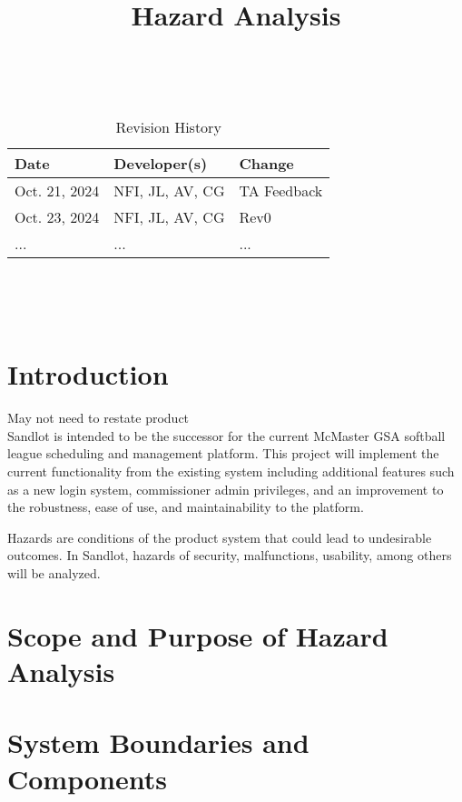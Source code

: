 \documentclass{article}
\title{Hazard Analysis\\\progname}
\author{\authname}
\date{}
\begin{document}
\maketitle
\thispagestyle{empty}

~\newpage


\begin{table}[hp]
\caption{Revision History} \label{TblRevisionHistory}
\begin{tabularx}{\textwidth}{llX}
\toprule
\textbf{Date} & \textbf{Developer(s)} & \textbf{Change}\\
\midrule
Oct. 21, 2024 & NFI, JL, AV, CG & TA Feedback\\
Oct. 23, 2024 & NFI, JL, AV, CG & Rev0\\
... & ... & ...\\
\bottomrule
\end{tabularx}
\end{table}

~\newpage

\tableofcontents

~\newpage


\section{Introduction}

May not need to restate product\\
Sandlot is intended to be the successor for the current McMaster GSA
softball league scheduling and management platform. This project
will implement the current functionality from the existing system including
additional features such as a new login system, commissioner admin
privileges, and an improvement to the robustness, ease of use, and
maintainability to the platform.

Hazards are conditions of the product system that could lead to undesirable outcomes. 
In Sandlot, hazards of security, malfunctions, usability, among others will be analyzed.

\section{Scope and Purpose of Hazard Analysis}


\section{System Boundaries and Components}
\end{document}
